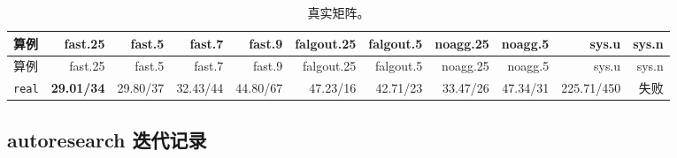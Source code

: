 {\tiny\setlength{\tabcolsep}{2.5pt}
\begin{longtable}{lrrrrrrrrrr}
\caption{真实矩阵。}\\
\toprule
算例 & fast.25 & fast.5 & fast.7 & fast.9 & falgout.25 & falgout.5 & noagg.25 & noagg.5 & sys.u & sys.n \\
\midrule
\endfirsthead
\toprule
算例 & fast.25 & fast.5 & fast.7 & fast.9 & falgout.25 & falgout.5 & noagg.25 & noagg.5 & sys.u & sys.n \\
\midrule
\endhead
\bottomrule
\endlastfoot
\texttt{real} & \textbf{29.01/34} & 29.80/37 & 32.43/44 & 44.80/67 & 47.23/16 & 42.71/23 & 33.47/26 & 47.34/31 & 225.71/450 & 失败 \\
\end{longtable}}
\subsection{autoresearch 迭代记录}
